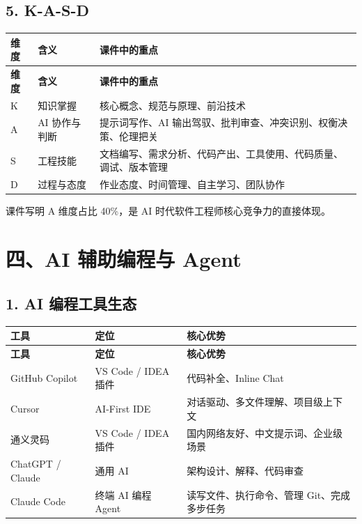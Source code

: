 \documentclass[UTF8,zihao=-4]{ctexart}
\begin{document}
\subsection{5. K-A-S-D}

{
\footnotesize
\begin{longtable}{|>{\raggedright\arraybackslash}p{}|>{\raggedright\arraybackslash}p{}|>{\raggedright\arraybackslash}p{}|}
\hline
\textbf{维度} & \textbf{含义} & \textbf{课件中的重点} \\
\hline
\endfirsthead
\hline
\textbf{维度} & \textbf{含义} & \textbf{课件中的重点} \\
\hline
\endhead
K & 知识掌握 & 核心概念、规范与原理、前沿技术 \\
\hline
A & AI 协作与判断 & 提示词写作、AI 输出驾驭、批判审查、冲突识别、权衡决策、伦理把关 \\
\hline
S & 工程技能 & 文档编写、需求分析、代码产出、工具使用、代码质量、调试、版本管理 \\
\hline
D & 过程与态度 & 作业态度、时间管理、自主学习、团队协作 \\
\hline
\end{longtable}
}


课件写明 A 维度占比 40\%，是 AI 时代软件工程师核心竞争力的直接体现。

\section{四、AI 辅助编程与 Agent}

\subsection{1. AI 编程工具生态}

{
\footnotesize
\begin{longtable}{|>{\raggedright\arraybackslash}p{}|>{\raggedright\arraybackslash}p{}|>{\raggedright\arraybackslash}p{}|}
\hline
\textbf{工具} & \textbf{定位} & \textbf{核心优势} \\
\hline
\endfirsthead
\hline
\textbf{工具} & \textbf{定位} & \textbf{核心优势} \\
\hline
\endhead
GitHub Copilot & VS Code / IDEA 插件 & 代码补全、Inline Chat \\
\hline
Cursor & AI-First IDE & 对话驱动、多文件理解、项目级上下文 \\
\hline
通义灵码 & VS Code / IDEA 插件 & 国内网络友好、中文提示词、企业级场景 \\
\hline
ChatGPT / Claude & 通用 AI & 架构设计、解释、代码审查 \\
\hline
Claude Code & 终端 AI 编程 Agent & 读写文件、执行命令、管理 Git、完成多步任务 \\
\hline
\end{longtable}
}
\end{document}
